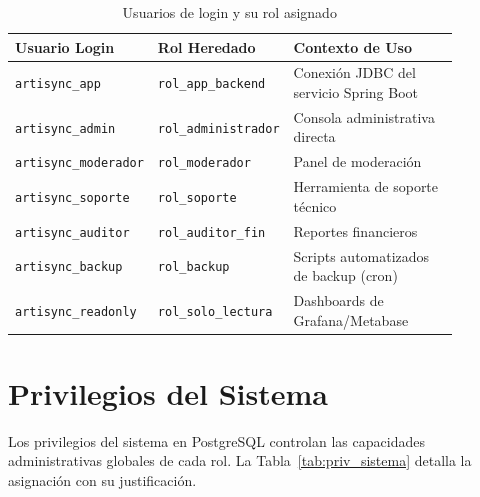 \documentclass[conference, onecolumn]{IEEEtran}
\begin{document}
\begin{table}[H]
\centering
\caption{Usuarios de login y su rol asignado}
\label{tab:usuarios_login}
\scriptsize
\begin{tabular}{>{\raggedright\arraybackslash}p{0.24\linewidth} >{\raggedright\arraybackslash}p{0.24\linewidth} >{\raggedright\arraybackslash}p{0.40\linewidth}}
\toprule
\textbf{Usuario Login} & \textbf{Rol Heredado} & \textbf{Contexto de Uso} \\
\midrule
\texttt{artisync\_app} & \texttt{rol\_app\_backend} & Conexión JDBC del servicio Spring Boot \\
\texttt{artisync\_admin} & \texttt{rol\_administrador} & Consola administrativa directa \\
\texttt{artisync\_moderador} & \texttt{rol\_moderador} & Panel de moderación \\
\texttt{artisync\_soporte} & \texttt{rol\_soporte} & Herramienta de soporte técnico \\
\texttt{artisync\_auditor} & \texttt{rol\_auditor\_fin} & Reportes financieros \\
\texttt{artisync\_backup} & \texttt{rol\_backup} & Scripts automatizados de backup (cron) \\
\texttt{artisync\_readonly} & \texttt{rol\_solo\_lectura} & Dashboards de Grafana/Metabase \\
\bottomrule
\end{tabular}
\end{table}

\section{Privilegios del Sistema}

Los privilegios del sistema en PostgreSQL controlan las capacidades administrativas globales de cada rol. La Tabla~\ref{tab:priv_sistema} detalla la asignación con su justificación.
\end{document}
